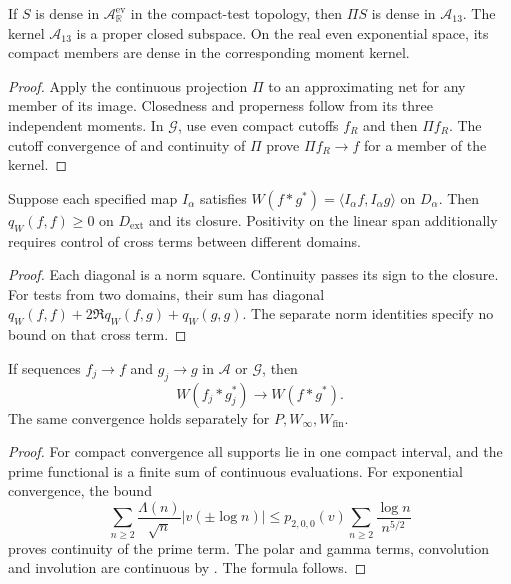 \begin{theorem}
\label{v4-arith:w6-b:thm:density}
If $S$ is dense in $\mathscr A_{\mathbb R}^{\mathrm{ev}}$ in the
compact-test topology, then $\Pi S$ is dense in $\mathscr A_{13}$.
The kernel $\mathscr A_{13}$ is a proper closed subspace.
On the real even exponential space, its compact members are dense
in the corresponding moment kernel.
\end{theorem}
\begin{proof}
Apply the continuous projection $\Pi$ to an approximating net for
any member of its image. Closedness and properness follow from its
three independent moments. In $\mathscr G$, use even compact cutoffs
$f_R$ and then $\Pi f_R$. The cutoff convergence of
 and continuity of $\Pi$ prove
$\Pi f_R\to f$ for a member of the kernel.
\end{proof}

\begin{proposition}
\label{v4-arith:w6-b:thm:ext-positivity-available}
Suppose each specified map $I_\alpha$ satisfies
$W(f*g^*)=\langle I_\alpha f,I_\alpha g\rangle$ on $D_\alpha$.
Then $q_W(f,f)\ge0$ on $D_{\mathrm{ext}}$ and its closure.
Positivity on the linear span additionally requires control of
cross terms between different domains.
\end{proposition}
\begin{proof}
Each diagonal is a norm square. Continuity passes its sign to the
closure. For tests from two domains, their sum has diagonal
$q_W(f,f)+2\Re q_W(f,g)+q_W(g,g)$. The separate norm identities
specify no bound on that cross term.
\end{proof}

\begin{theorem}
\label{v4-arith:w6-b:thm:schwartz-closure}
If sequences $f_j\to f$ and $g_j\to g$ in $\mathscr A$ or $\mathscr G$, then
\begin{equation}
\label{v4-arith:w6-b:eq:schwartz-closure}
 W(f_j*g_j^*)\longrightarrow W(f*g^*).
\end{equation}
The same convergence holds separately for $P,W_\infty,W_{\mathrm{fin}}$.
\end{theorem}
\begin{proof}
For compact convergence all supports lie in one compact interval,
and the prime functional is a finite sum of continuous evaluations.
For exponential convergence, the bound
\[
 \sum_{n\ge2}\frac{\Lambda(n)}{\sqrt n}|v(\pm\log n)|
 \le p_{2,0,0}(v)\sum_{n\ge2}\frac{\log n}{n^{5/2}}
\]
proves continuity of the prime term. The polar and gamma terms,
convolution and involution are continuous by
. The formula follows.
\end{proof}

